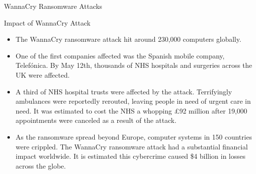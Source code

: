 \documentclass{beamer}
\begin{document}
\begin{frame}{WannaCry Ransomware Attacks}
	\begin{itemize}
\end{itemize}
\end{frame}
\begin{frame}{Impact of WannaCry Attack}
	\begin{itemize}
\item{The WannaCry ransomware attack hit around 230,000 computers globally.}
\item{One of the first companies affected was the Spanish mobile company, Telefónica. By May 12th, thousands of NHS hospitals and surgeries across the UK were affected.}
\item{A third of NHS hospital trusts were affected by the attack. Terrifyingly ambulances were reportedly rerouted, leaving people in need of urgent care in need. It was estimated to cost the NHS a whopping £92 million after 19,000 appointments were canceled as a result of the attack.}
 \item{As the ransomware spread beyond Europe, computer systems in 150 countries were crippled. The WannaCry ransomware attack had a substantial financial impact worldwide. It is estimated this cybercrime caused \$4 billion in losses across the globe.}
	\end{itemize}
\end{frame}
\end{document}
